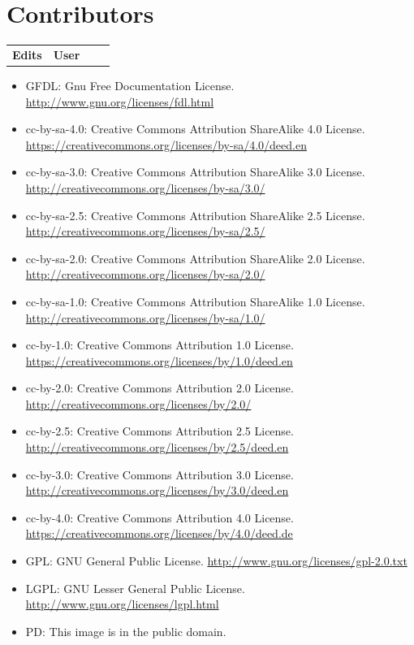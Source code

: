 \documentclass[fontsize=11pt,paper=A4,BCOR=12mm,DIV=13,open=any,listof=totoc,toc=flat]{scrbook}
\begin{document}
\chapter{Contributors}
\label{Contributors}
\begin{longtable}{rp{0.6\linewidth}}
\textbf{Edits}&\textbf{User}\\
\end{longtable}
\pagebreak
\listoffigures
\label{ListOfFigures}
\begin{itemize}
\item GFDL: Gnu Free Documentation License. \url{http://www.gnu.org/licenses/fdl.html}
\item cc-by-sa-4.0:  Creative Commons Attribution ShareAlike 4.0 License. \url{https://creativecommons.org/licenses/by-sa/4.0/deed.en} 
\item cc-by-sa-3.0:  Creative Commons Attribution ShareAlike 3.0 License. \url{http://creativecommons.org/licenses/by-sa/3.0/} 
\item cc-by-sa-2.5:  Creative Commons Attribution ShareAlike 2.5 License. \url{http://creativecommons.org/licenses/by-sa/2.5/} 
\item cc-by-sa-2.0:  Creative Commons Attribution ShareAlike 2.0 License. \url{http://creativecommons.org/licenses/by-sa/2.0/} 
\item cc-by-sa-1.0:  Creative Commons Attribution ShareAlike 1.0 License. \url{http://creativecommons.org/licenses/by-sa/1.0/} 
\item cc-by-1.0:  Creative Commons Attribution 1.0 License. \url{https://creativecommons.org/licenses/by/1.0/deed.en} 
\item cc-by-2.0:  Creative Commons Attribution 2.0 License.  \url{http://creativecommons.org/licenses/by/2.0/}  
\item cc-by-2.5:  Creative Commons Attribution 2.5 License. \url{http://creativecommons.org/licenses/by/2.5/deed.en}  
\item cc-by-3.0:  Creative Commons Attribution 3.0 License. \url{http://creativecommons.org/licenses/by/3.0/deed.en}
\item cc-by-4.0:  Creative Commons Attribution 4.0 License. \url{https://creativecommons.org/licenses/by/4.0/deed.de} 
\item GPL:  GNU General Public License. \url{http://www.gnu.org/licenses/gpl-2.0.txt} 
\item LGPL:  GNU Lesser General Public License. \url{http://www.gnu.org/licenses/lgpl.html}
 \item PD: This image is in the public domain.

\end{itemize}
\end{document}
